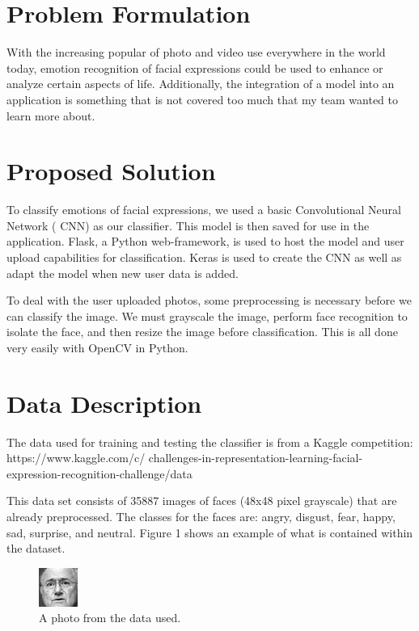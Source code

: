 \documentclass[conference]{IEEEtran}
\begin{document}
\section{Problem Formulation} 
With the increasing popular of photo and video use everywhere in the world today, emotion 
recognition of facial expressions could be used to enhance or analyze certain aspects of 
life. Additionally, the integration of a model into an application is something that is 
not covered too much that my team wanted to learn more about.

\section{Proposed Solution}
To classify emotions of facial expressions, we used a basic Convolutional Neural Network (
CNN) as our classifier. This model is then saved for use in the application. Flask, a 
Python web-framework, is used to host the model and user upload capabilities for 
classification. Keras is used to create the CNN as well as adapt the model when new user 
data is added.

To deal with the user uploaded photos, some preprocessing is necessary before we can 
classify the image. We must grayscale the image, perform face recognition to isolate
the face, and then resize the image before classification. This is all done very
easily with OpenCV in Python.

\section{Data Description}
The data used for training and testing the classifier is from a Kaggle competition:
https://www.kaggle.com/c/
challenges-in-representation-learning-facial-expression-recognition-challenge/data

This data set consists of 35887 images of faces (48x48 pixel grayscale) that are already 
preprocessed. The classes for the faces are: angry, disgust, fear, happy, sad, surprise, 
and neutral. Figure 1 shows an example of what is contained within the dataset. 

\begin{figure}[t]
\caption{A photo from the data used.}
\includegraphics[scale=2]{face}
\centering
\end{figure}
\end{document}
